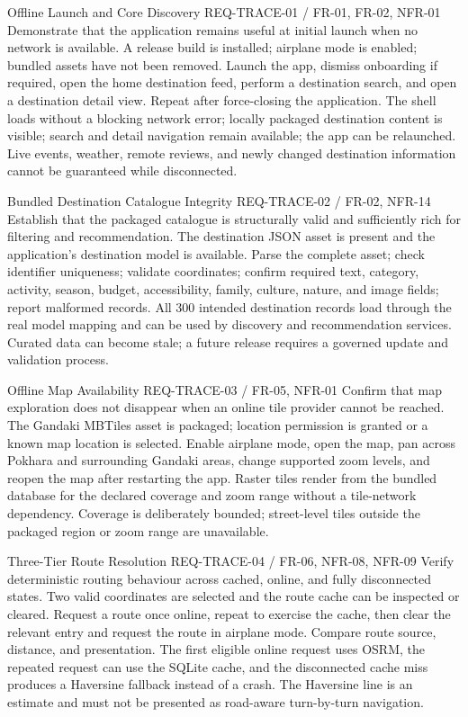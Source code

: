 \EvidenceSheet
{Offline Launch and Core Discovery}
{REQ-TRACE-01 / FR-01, FR-02, NFR-01}
{Demonstrate that the application remains useful at initial launch when no network is available.}
{A release build is installed; airplane mode is enabled; bundled assets have not been removed.}
{Launch the app, dismiss onboarding if required, open the home destination feed, perform a destination search, and open a destination detail view. Repeat after force-closing the application.}
{The shell loads without a blocking network error; locally packaged destination content is visible; search and detail navigation remain available; the app can be relaunched.}
{Live events, weather, remote reviews, and newly changed destination information cannot be guaranteed while disconnected.}

\EvidenceSheet
{Bundled Destination Catalogue Integrity}
{REQ-TRACE-02 / FR-02, NFR-14}
{Establish that the packaged catalogue is structurally valid and sufficiently rich for filtering and recommendation.}
{The destination JSON asset is present and the application's destination model is available.}
{Parse the complete asset; check identifier uniqueness; validate coordinates; confirm required text, category, activity, season, budget, accessibility, family, culture, nature, and image fields; report malformed records.}
{All 300 intended destination records load through the real model mapping and can be used by discovery and recommendation services.}
{Curated data can become stale; a future release requires a governed update and validation process.}

\EvidenceSheet
{Offline Map Availability}
{REQ-TRACE-03 / FR-05, NFR-01}
{Confirm that map exploration does not disappear when an online tile provider cannot be reached.}
{The Gandaki MBTiles asset is packaged; location permission is granted or a known map location is selected.}
{Enable airplane mode, open the map, pan across Pokhara and surrounding Gandaki areas, change supported zoom levels, and reopen the map after restarting the app.}
{Raster tiles render from the bundled database for the declared coverage and zoom range without a tile-network dependency.}
{Coverage is deliberately bounded; street-level tiles outside the packaged region or zoom range are unavailable.}

\EvidenceSheet
{Three-Tier Route Resolution}
{REQ-TRACE-04 / FR-06, NFR-08, NFR-09}
{Verify deterministic routing behaviour across cached, online, and fully disconnected states.}
{Two valid coordinates are selected and the route cache can be inspected or cleared.}
{Request a route once online, repeat to exercise the cache, then clear the relevant entry and request the route in airplane mode. Compare route source, distance, and presentation.}
{The first eligible online request uses OSRM, the repeated request can use the SQLite cache, and the disconnected cache miss produces a Haversine fallback instead of a crash.}
{The Haversine line is an estimate and must not be presented as road-aware turn-by-turn navigation.}

